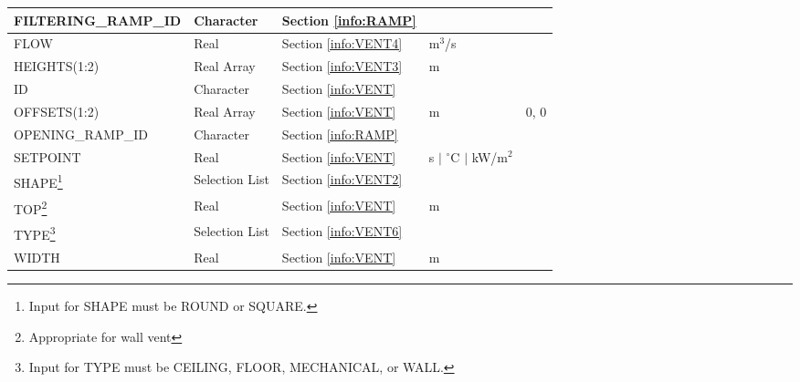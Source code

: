 \begin{minipage}{6.5in}
\begin{longtable}{@{\extracolsep{\fill}}|l|l|l|l|l|}
{\ct FILTERING\_RAMP\_ID}    	  & Character   & Section \ref{info:RAMP}                 &                             &                 \\ \hline
{\ct FLOW}      	  & Real  	& Section \ref{info:VENT4}                 & m$^3$/s                     &                 \\ \hline
{\ct HEIGHTS(1:2)}         & Real Array 	& Section \ref{info:VENT3}                 & m                           &                 \\ \hline
{\ct ID}       		  & Character   & Section \ref{info:VENT}                 &                             &                 \\ \hline
{\ct OFFSETS(1:2)}         & Real Array 	& Section \ref{info:VENT}                 & m                           &      0, 0        \\ \hline
{\ct OPENING\_RAMP\_ID}   & Character  	& Section \ref{info:RAMP}                 &                             &                 \\ \hline
{\ct SETPOINT}            & Real  	& Section \ref{info:VENT}                 & s $\mid$ $^\circ$C $\mid$ kW/m$^2$ &                 \\ \hline
{\ct SHAPE}\footnote{Input for {\ct SHAPE} must be {\ct ROUND} or {\ct SQUARE}.}     	  & Selection List   & Section \ref{info:VENT2}                 &                             &                 \\ \hline
{\ct TOP}\footnote{Appropriate for wall vent}                 & Real  	& Section \ref{info:VENT}                 & m                           &                 \\ \hline
{\ct TYPE}\footnote{Input for {\ct TYPE} must be {\ct CEILING}, {\ct FLOOR}, {\ct MECHANICAL}, or {\ct WALL}. }                & Selection List    & Section \ref{info:VENT6}                 &                             &                 \\ \hline
{\ct WIDTH}               & Real  	& Section \ref{info:VENT}                 & m                           &                 \\ \hline
\end{longtable}
\end{minipage}


